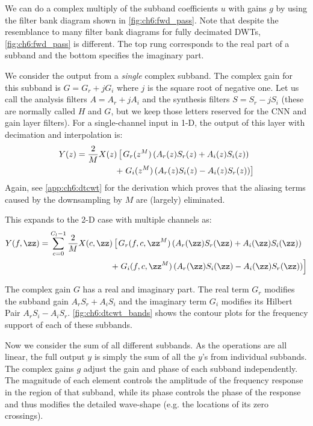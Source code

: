 We can do a complex multiply of the subband coefficients $u$ with gains $g$ by
using the filter bank diagram shown in \autoref{fig:ch6:fwd_pass}. Note that despite the resemblance to many filter
bank diagrams for fully decimated DWTs, \autoref{fig:ch6:fwd_pass} is different.
The top rung corresponds to the real part of a subband and the bottom specifies
the imaginary part.

We consider the output from a \emph{single} complex subband. The complex gain for this
subband is $G = G_r + jG_i$ where $j$ is the square root of negative one.
Let us call the analysis filters $A = A_r + jA_i$ and 
the synthesis filters $S = S_r - jS_i$ (these are normally called $H$ and
$G$, but we keep those letters reserved for the CNN and gain layer filters).
For a single-channel input in 1-D, the output of this layer with decimation and interpolation is:
\begin{align}\label{eq:ch6:dtcwt_fwd}
  Y(z) = \frac{2}{M}X(z) \left[\vphantom{z^{M}} \right. &  G_r(z^{M}) \left(A_r(z)S_r(z) + A_i(z)S_i(z)\right) \nonumber \\
  +  & \left. G_i(z^{M}) \left( A_r(z)S_i(z) - A_i(z)S_r(z)\right) \right] 
\end{align}
Again, see \autoref{app:ch6:dtcwt} for the derivation which proves that the aliasing
terms caused by the downsampling by $M$ are (largely) eliminated. 

This expands to the 2-D case with multiple channels as:
\begin{align}\label{eq:ch6:dtcwt_fwd}
  Y(f, \zz) = \sum_{c=0}^{C_l-1} \frac{2}{M}X(c, \zz) \left[\vphantom{z^{M}} \right. &  G_r(f, c, \zz^{M}) \left(A_r(\zz)S_r(\zz) 
  + A_i(\zz)S_i(\zz)\right) \nonumber \\
  +  & \left. G_i(f, c, \zz^{M}) \left( A_r(\zz)S_i(\zz) - A_i(\zz)S_r(\zz)\right) \right] 
\end{align}

The complex gain $G$ has a real and imaginary part. The real term $G_r$ 
modifies the subband gain $A_rS_r + A_iS_i$ and the imaginary term $G_i$ modifies its
Hilbert Pair $A_rS_i - A_iS_r$. \autoref{fig:ch6:dtcwt_bands} shows the contour
plots for the frequency support of each of these subbands. 

Now we consider the sum of all different subbands. As the operations are all
linear, the full output $y$ is simply the sum of all the $y$'s from individual
subbands. The complex gains $g$ adjust the gain and phase of each subband
independently. The magnitude of each element controls the amplitude of the
frequency response in the region of that subband, while its phase controls the
phase of the response and thus modifies the detailed wave-shape (e.g. the
locations of its zero crossings).

